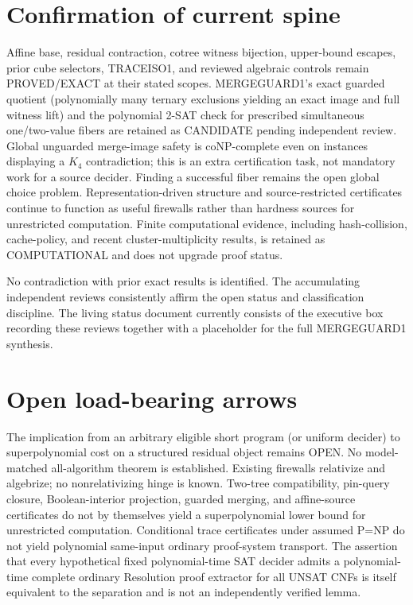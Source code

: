 \documentclass[11pt]{article}
\begin{document}
\section{Confirmation of current spine}
Affine base, residual contraction, cotree witness bijection, upper-bound escapes, prior cube selectors, TRACEISO1, and reviewed algebraic controls remain PROVED/EXACT at their stated scopes. MERGEGUARD1's exact guarded quotient (polynomially many ternary exclusions yielding an exact image and full witness lift) and the polynomial 2-SAT check for prescribed simultaneous one/two-value fibers are retained as CANDIDATE pending independent review. Global unguarded merge-image safety is coNP-complete even on instances displaying a $K_4$ contradiction; this is an extra certification task, not mandatory work for a source decider. Finding a successful fiber remains the open global choice problem. Representation-driven structure and source-restricted certificates continue to function as useful firewalls rather than hardness sources for unrestricted computation. Finite computational evidence, including hash-collision, cache-policy, and recent cluster-multiplicity results, is retained as COMPUTATIONAL and does not upgrade proof status.

No contradiction with prior exact results is identified. The accumulating independent reviews consistently affirm the open status and classification discipline. The living status document currently consists of the executive box recording these reviews together with a placeholder for the full MERGEGUARD1 synthesis.

\section{Open load-bearing arrows}
The implication from an arbitrary eligible short program (or uniform decider) to superpolynomial cost on a structured residual object remains OPEN. No model-matched all-algorithm theorem is established. Existing firewalls relativize and algebrize; no nonrelativizing hinge is known. Two-tree compatibility, pin-query closure, Boolean-interior projection, guarded merging, and affine-source certificates do not by themselves yield a superpolynomial lower bound for unrestricted computation. Conditional trace certificates under assumed P=NP do not yield polynomial same-input ordinary proof-system transport. The assertion that every hypothetical fixed polynomial-time SAT decider admits a polynomial-time complete ordinary Resolution proof extractor for all UNSAT CNFs is itself equivalent to the separation and is not an independently verified lemma.
\end{document}
